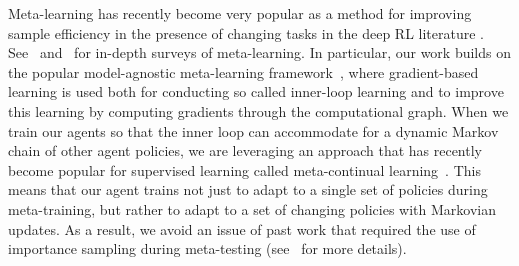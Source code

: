 Meta-learning \citep{schmidhuber87meta_learning, bengio1992optimization} has recently become very popular as a method for improving sample efficiency in the presence of changing tasks in the deep RL literature \citep{wang2016learning,duan2016rl,maml,snail,Reptile}. See~\citet{vilalta2002perspective} and~\citet{hospedales2020meta} for in-depth surveys of meta-learning. In particular, our work builds on the popular model-agnostic meta-learning framework~\citep{maml}, where gradient-based learning is used both for conducting so called inner-loop learning and to improve this learning by computing gradients through the computational graph. When we train our agents so that the inner loop can accommodate for a dynamic Markov chain of other agent policies, we are leveraging an approach that has recently become popular for supervised learning called meta-continual learning~\citep{MER,Javed2019Meta,spigler2019meta,beaulieu2020learning,caccia2020online,Gupta2020LaMAMLLM}. 
This means that our agent trains not just to adapt to a single set of policies during meta-training, but rather to adapt to a set of changing policies with Markovian updates. 
As a result, we avoid an issue of past work \citep{alshedivat2018continuous} that required the use of importance sampling during meta-testing (see~ for more details).
